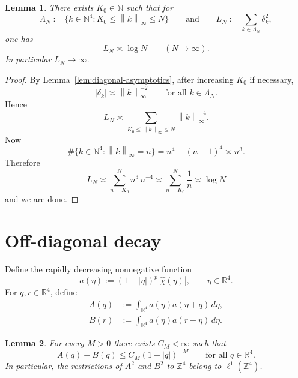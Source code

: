 \documentclass[11pt, reqno]{amsart}
\newtheorem{lemma}{Lemma}
\theoremstyle{remark}
\newcommand{\R}{\mathbb{R}}
\newcommand{\N}{\mathbb{N}}
\newcommand{\Z}{\mathbb{Z}}
\newcommand{\1}{\mathbf{1}}
\newcommand{\abs}[1]{\left\lvert #1 \right\rvert}
\newcommand{\norm}[1]{\left\lVert #1 \right\rVert}
\newcommand{\what}[1]{\widehat{#1}}
\begin{document}
\begin{lemma}\label{lem:log-growth}
There exists $K_0\in\N$ such that for
\[
\Lambda_N:=\{k\in\N^4: K_0\le \norm{k}_\infty\le N\}
\qquad\text{and}\qquad
L_N:=\sum_{k\in\Lambda_N} \delta_k^2,
\]
one has
\begin{equation}\label{eq:LN-log}
L_N\asymp \log N\qquad (N\to\infty).
\end{equation}
In particular $L_N\to\infty$.
\end{lemma}

\begin{proof}
By Lemma~\ref{lem:diagonal-asymptotics}, after increasing $K_0$ if necessary,
\[
\abs{\delta_k}\asymp \norm{k}_\infty^{-2}\qquad\text{for all }k\in\Lambda_N.
\]
Hence
\[
L_N\asymp \sum_{K_0\le \norm{k}_\infty\le N} \norm{k}_\infty^{-4}.
\]
Now
\[
\#\{k\in\N^4:\norm{k}_\infty=n\}=n^4-(n-1)^4\asymp n^3.
\]
Therefore
\[
L_N\asymp \sum_{n=K_0}^N n^3\,n^{-4} \asymp \sum_{n=K_0}^N \frac1n \asymp \log N
\]
 and we are done.
\end{proof}

\section{Off-diagonal decay}
Define the rapidly decreasing nonnegative function
\[
a(\eta):=(1+\abs{\eta})^p\abs{\what\chi(\eta)},\qquad \eta\in\R^4.
\]
For $q,r\in\R^4$, define
\begin{align}
A(q)&:=\int_{\R^4} a(\eta)a(\eta+q)\,d\eta,
\label{eq:A-def}
\\
B(r)&:=\int_{\R^4} a(\eta)a(r-\eta)\,d\eta.
\label{eq:B-def}
\end{align}

\begin{lemma}\label{lem:A-B-rapid}
For every $M>0$ there exists $C_M<\infty$ such that
\begin{equation}\label{eq:A-B-rapid}
A(q)+B(q)\le C_M(1+\abs{q})^{-M}\qquad\text{for all }q\in\R^4.
\end{equation}
In particular, the restrictions of $A^2$ and $B^2$ to $\Z^4$ belong to $\ell^1(\Z^4)$.
\end{lemma}
\end{document}
